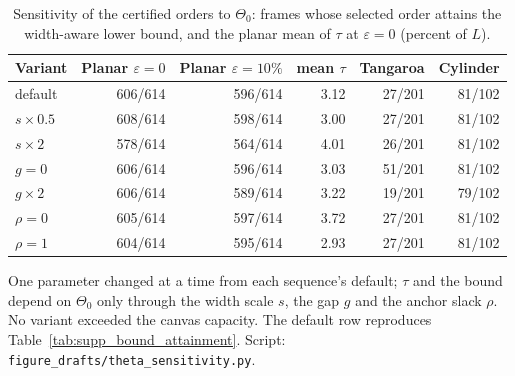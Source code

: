 \begin{table}[H]
\centering\small\setlength{\tabcolsep}{3.2pt}
\caption{Sensitivity of the certified orders to $\Theta_0$: frames whose selected order attains the width-aware lower bound, and the planar mean of $\tau$ at $\varepsilon=0$ (percent of $L$).}\label{tab:supp_theta}
\begin{tabular}{lrrrrr}\toprule
Variant & Planar $\varepsilon{=}0$ & Planar $\varepsilon{=}10\%$ & mean $\tau$ & Tangaroa & Cylinder\\\midrule
default & 606/614 & 596/614 & 3.12 & 27/201 & 81/102\\
$s\times0.5$ & 608/614 & 598/614 & 3.00 & 27/201 & 81/102\\
$s\times2$ & 578/614 & 564/614 & 4.01 & 26/201 & 81/102\\
$g=0$ & 606/614 & 596/614 & 3.03 & 51/201 & 81/102\\
$g\times2$ & 606/614 & 589/614 & 3.22 & 19/201 & 79/102\\
$\rho=0$ & 605/614 & 597/614 & 3.72 & 27/201 & 81/102\\
$\rho=1$ & 604/614 & 595/614 & 2.93 & 27/201 & 81/102\\
\bottomrule\end{tabular}
\par\smallskip\parbox{\linewidth}{\footnotesize One parameter changed at a time from each sequence\textquoteright s default; $\tau$ and the bound depend on $\Theta_0$ only through the width scale $s$, the gap $g$ and the anchor slack $\rho$. No variant exceeded the canvas capacity. The default row reproduces Table~\ref{tab:supp_bound_attainment}. Script: \texttt{figure\_drafts/theta\_sensitivity.py}.}
\end{table}
